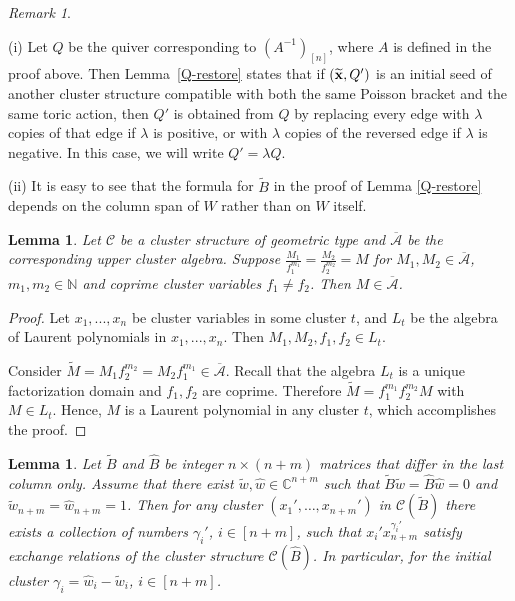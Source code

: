 \documentclass{amsart}
\newtheorem{lemma}[theorem]{Lemma}
\theoremstyle{definition}
\theoremstyle{remark}
\newtheorem{remark}[theorem]{Remark}
\numberwithin{equation}{section}
\numberwithin{theorem}{section}
\begin{document}
\begin{remark}
\label{afterQ-restore}
{\rm (i) Let $Q$ be the quiver corresponding to $(A^{-1})_{[n]}$, where $A$ is defined in the proof above. Then Lemma~\ref{Q-restore} states that if  $({{\widetilde{\bf x}}}, Q')$ is an initial seed of another cluster structure compatible with both the same Poisson bracket and the same toric action, then $Q'$ is obtained from $Q$ by replacing every edge with $\lambda$ copies of that edge if $\lambda$ is positive, or with $\lambda$ copies of the reversed edge if $\lambda$ is negative. In this case, we will write
$Q'=\lambda Q$.

(ii) It is easy to see that the formula for ${{\widetilde{B}}}$ in the proof of Lemma \ref{Q-restore} depends on the column span of $W$ rather than on $W$ itself.
}
\end{remark}

 \begin{lemma}
 \label{twoloc}
Let ${{\mathcal C}}$ be a cluster structure of geometric type and ${\overline{{\mathcal A}}}$ be the corresponding
upper cluster algebra.
Suppose $\frac{M_1}{f_1^{m_1}}=\frac{M_2}{f_2^{m_2}}=M$
for  $M_1, M_2\in {\overline{{\mathcal A}}}$, $m_1, m_2 \in \mathbb{N}$  and coprime cluster
variables $f_1\ne f_2$. Then $M\in {\overline{{\mathcal A}}}$.
 \end{lemma}
 
 \begin{proof}
 Let $x_1,...,x_n$ be cluster variables in some cluster $t$, and $L_t$ be the algebra of Laurent polynomials in $x_1,...,x_n$.  Then $M_1, M_2,f_1,f_2\in L_t$.

Consider $\tilde M=M_1 f_2^{m_2}=M_2 f_1^{m_1}\in {\overline{{\mathcal A}}}$.
Recall that  the algebra $L_t$  is a unique factorization domain and  $f_1, f_2$ are coprime.
Therefore $\tilde M=f_1^{m_1} f_2^{m_2} M$ with $M\in L_t$. Hence, $M$ is a Laurent polynomial in any cluster $t$, which accomplishes the proof.
\end{proof}
 
 

 

\begin{lemma} \label{MishaSha}
Let ${{\widetilde{B}}}$ and 
${{\widehat{B}}}$ be integer $n\times (n+m)$ matrices that differ in the last column only.
Assume that there exist $\tilde w, \hat w\in{{\mathbb C}}^{n+m}$ such that ${{\widetilde{B}}}\tilde w={{\widehat{B}}}\hat w=0$ and
$\tilde w_{n+m}=\hat w_{n+m}=1$. Then for any cluster $(x_1',\dots,x_{n+m}')$ in ${{\mathcal C}}({{\widetilde{B}}})$ there exists a collection of numbers
$\gamma_i'$, $i\in [n+m]$,  such that $x_i' x_{n+m}^{\gamma_i'}$ satisfy exchange relations of 
the cluster structure ${{\mathcal C}}({{\widehat{B}}})$. In particular, for the initial cluster $\gamma_i=\hat w_i-\tilde w_i$,
$i\in [n+m]$.
\end{lemma}
\end{document}
